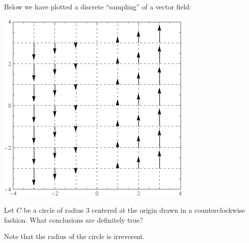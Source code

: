 \documentclass{ximera}
\begin{document}
\begin{exercise}
  Below we have plotted a discrete ``sampling'' of a vector field:
  \begin{image}
    \includegraphics{field7.png}
  \end{image}
  Let $C$ be a circle of radius $3$ centered at the origin drawn in a
  counterclockwise fashion.  What conclusions are definitely true?
  \begin{selectAll}
  \end{selectAll}
  \begin{hint}
    Note that the radius of the circle is irreverent. 
  \end{hint}
\end{exercise}
\end{document}
